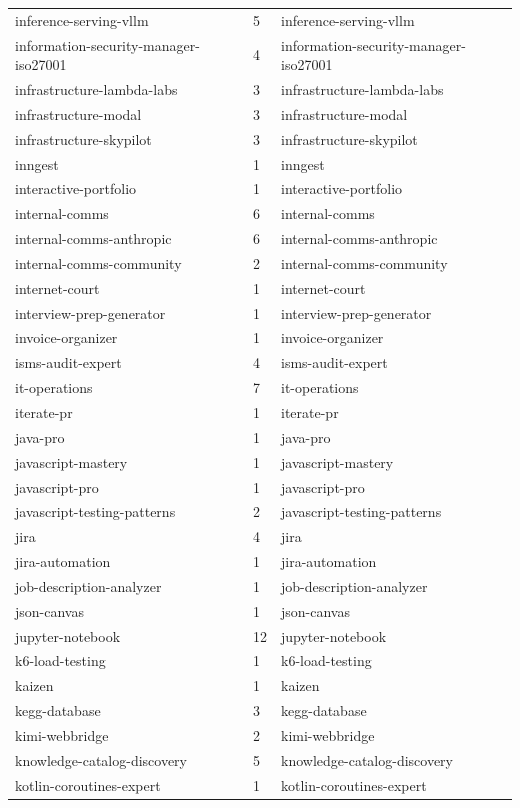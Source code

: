 \begin{longtable}{@{}lll@{}}
inference-serving-vllm & 5 & inference-serving-vllm\\
information-security-manager-iso27001 & 4 & information-security-manager-iso27001\\
infrastructure-lambda-labs & 3 & infrastructure-lambda-labs\\
infrastructure-modal & 3 & infrastructure-modal\\
infrastructure-skypilot & 3 & infrastructure-skypilot\\
inngest & 1 & inngest\\
interactive-portfolio & 1 & interactive-portfolio\\
internal-comms & 6 & internal-comms\\
internal-comms-anthropic & 6 & internal-comms-anthropic\\
internal-comms-community & 2 & internal-comms-community\\
internet-court & 1 & internet-court\\
interview-prep-generator & 1 & interview-prep-generator\\
invoice-organizer & 1 & invoice-organizer\\
isms-audit-expert & 4 & isms-audit-expert\\
it-operations & 7 & it-operations\\
iterate-pr & 1 & iterate-pr\\
java-pro & 1 & java-pro\\
javascript-mastery & 1 & javascript-mastery\\
javascript-pro & 1 & javascript-pro\\
javascript-testing-patterns & 2 & javascript-testing-patterns\\
jira & 4 & jira\\
jira-automation & 1 & jira-automation\\
job-description-analyzer & 1 & job-description-analyzer\\
json-canvas & 1 & json-canvas\\
jupyter-notebook & 12 & jupyter-notebook\\
k6-load-testing & 1 & k6-load-testing\\
kaizen & 1 & kaizen\\
kegg-database & 3 & kegg-database\\
kimi-webbridge & 2 & kimi-webbridge\\
knowledge-catalog-discovery & 5 & knowledge-catalog-discovery\\
kotlin-coroutines-expert & 1 & kotlin-coroutines-expert\\

\end{longtable}
